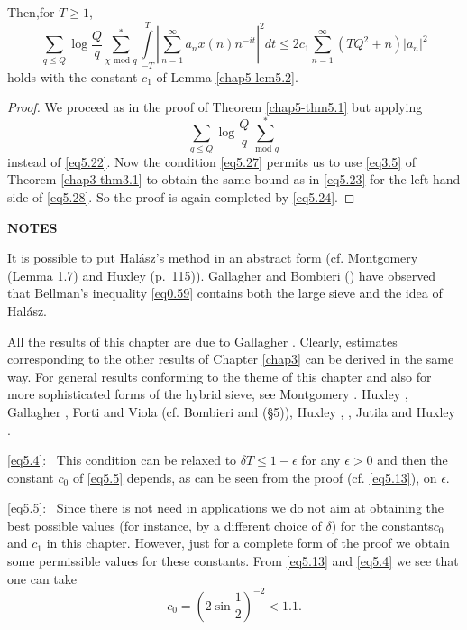 Then,\pageoriginale for $T \geq 1$,
\begin{equation*}
\sum_{q\leq Q} \log \frac{Q}{q} \sum_{\chi \text{ mod }q}^*
\int\limits_{-T}^{T} | \sum^{\infty}_{n=1} a_n x(n)n^{-it} |^2 dt \leq
2c_1 \sum_{n=1}^\infty (TQ^2 + n) | a_n |^2 \tag{5.28}\label{eq5.28} 
\end{equation*}
holds with the constant $c_1$ of Lemma \ref{chap5-lem5.2}.

\begin{proof}%
We proceed as in the proof of Theorem \ref{chap5-thm5.1} but applying
\begin{equation*}
\sum_{q \leq Q} \log \frac{Q}{q} \sum_{\text{ mod }q}^{*}
\tag{5.29}\label{eq5.29}
\end{equation*}
instead of \eqref{eq5.22}. Now the condition \eqref{eq5.27} permits us
to use \eqref{eq3.5} of Theorem \ref{chap3-thm3.1} to obtain the same
bound as in \eqref{eq5.23} for 
the left-hand side of \eqref{eq5.28}. So the proof is again completed by
\eqref{eq5.24}. 
\end{proof}

\medskip
\begin{center}
{\bf NOTES}
\end{center}

It is possible to put Hal\'asz's method in an abstract form
(cf. Montgomery \cite{key5} (Lemma 1.7) and Huxley \cite{key7}
(p.~115)). Gallagher and Bom\-bieri (\cite{key3}) have observed that Bellman's
inequality \eqref{eq0.59} contains both the large sieve and the idea of
Hal\'asz. 

All the results of this chapter are due to Gallagher \cite{key4}. Clearly,
estimates corresponding to the other results of Chapter \ref{chap3} can be
derived in the same way. For general results conforming to the theme
of this chapter and also for more sophisticated forms of the hybrid
sieve, see Montgomery \cite{key5}. Huxley \cite{key7}, Gallagher
\cite{key4}, Forti and Viola \cite{key1} (cf. Bombieri \cite{key5} and
\cite{key6} (\S 5)), Huxley
\cite{key9}, \cite{key11}, Jutila \cite{key6} and Huxley \cite{key12}. 

\eqref{eq5.4}:~ This condition can be relaxed to $\delta T \leq 1 -
\epsilon$ for any $\epsilon > 0$ and then the constant $c_0$ of
\eqref{eq5.5} depends, as can be seen from the proof
(cf. \eqref{eq5.13}), on $\epsilon$. 

\eqref{eq5.5}:~ Since there is not need in applications we do not aim
at obtaining the best possible values (for instance, by a different
choice of $\delta$) for the constants\pageoriginale $c_0$ and $c_1$ in this
chapter. However, just for a complete form of the proof we obtain some
permissible values for these constants. From \eqref{eq5.13} and
\eqref{eq5.4} we see that one can take  
\begin{equation*}
c_0 = (2 \sin \frac{1}{2})^{-2} < 1.1. \tag{5.30}\label{eq5.30}
\end{equation*}


